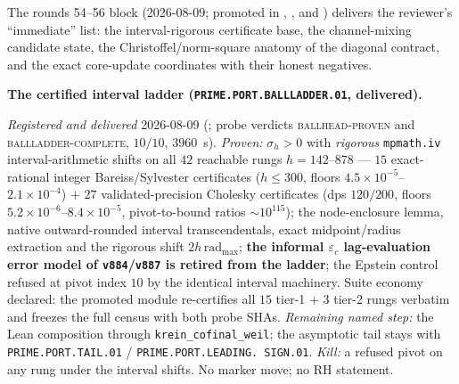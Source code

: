 \documentclass[11pt,a4paper]{article}
\begin{document}
\par\smallskip\noindent The rounds 54--56 block (2026-08-09;
promoted in ,
,
 and
) delivers the reviewer's
``immediate'' list: the interval-rigorous certificate base, the
channel-mixing candidate state, the Christoffel/norm-square
anatomy of the diagonal contract, and the exact core-update
coordinates with their honest negatives.

\par\smallskip\noindent\textbf{The certified interval ladder
(\texttt{PRIME.PORT.\allowbreak BALLLADDER.01}, delivered).}
{\sloppy
\emph{Registered and delivered} 2026-08-09
(; probe verdicts
\textsc{ballhead-proven} and \textsc{ballladder-complete},
$10/10$, $3960$~s).  \emph{Proven:} $\sigma_h > 0$ with
\emph{rigorous} \texttt{mpmath.iv} interval-arithmetic shifts on
all $42$ reachable rungs $h = 142$--$878$ --- $15$
exact-rational integer Bareiss/Sylvester certificates ($h \le
300$, floors $4.5\times10^{-5}$--$2.1\times10^{-4}$) $+$ $27$
validated-precision Cholesky certificates (dps $120/200$, floors
$5.2\times10^{-6}$--$8.4\times10^{-5}$, pivot-to-bound ratios
${\sim}10^{115}$); the node-enclosure lemma, native
outward-rounded interval transcendentals, exact midpoint/radius
extraction and the rigorous shift $2h\,\mathrm{rad}_{\max}$;
\textbf{the informal $\varepsilon_c$ lag-evaluation error model
of \texttt{v884}/\texttt{v887} is retired from the ladder}; the
Epstein control refused at pivot index $10$ by the identical
interval machinery.  Suite economy declared: the promoted module
re-certifies all $15$ tier-1 $+$ $3$ tier-2 rungs verbatim and
freezes the full census with both probe SHAs.  \emph{Remaining
named step:} the Lean composition through
\texttt{krein\_cofinal\_weil}; the asymptotic tail stays with
\texttt{PRIME.PORT.TAIL.01} / \texttt{PRIME.PORT.LEADING.%
SIGN.01}.  \emph{Kill:} a refused pivot on any rung under the
interval shifts.  No marker move; no RH statement.\par}
\end{document}

